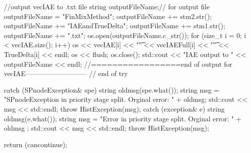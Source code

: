 \begin{DoxyCode}
{{         //output vecIAE to .txt file
      string outputFileName;// for output file
      outputFileName = "FinMixMethod";
      outputFileName += stm2.str();
      outputFileName += "IAEandTrueDelta";
      outputFileName += stm1.str();
      outputFileName += ".txt";
      os.open(outputFileName.c_str());
      for (size_t i = 0; i < vecIAE.size(); i++){
        os << vecIAE[i] << "\t" << vecIAEFull[i] << "\t" << TrueDelta[i] << 
      endl;
      }
      os << flush;
      os.close();
      std::cout << "IAE output to " << outputFileName << endl;
      //=================end of output for vecIAE---------------------------      
   } // end of try
    
    catch (SPnodeException& spe) {
        string oldmsg(spe.what());
        string msg = "SPnodeException in priority stage split.  Orginal error: 
      "
                                    + oldmsg;
        std::cout << msg << std::endl;
        throw HistException(msg);
    }
    catch (exception& e) {
        string oldmsg(e.what());
        string msg = "Error in priority stage split.  Orginal error: " + oldmsg
      ;
        std::cout << msg << std::endl;
        throw HistException(msg);
    }
    
   return (cancontinue);
}
\end{DoxyCode}
